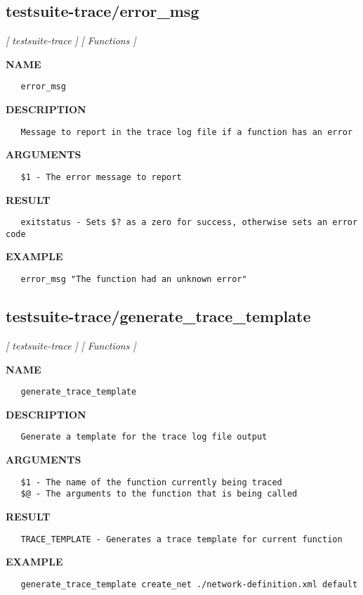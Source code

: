 \subsection{testsuite-trace/error\_msg}
\textsl{[ testsuite-trace ]}
\textsl{[ Functions ]}

\label{ch:robo52}
\label{ch:testsuite_trace_error_msg}
\textbf{NAME}
\begin{verbatim}
   error_msg
\end{verbatim}
\textbf{DESCRIPTION}
\begin{verbatim}
   Message to report in the trace log file if a function has an error
\end{verbatim}
\textbf{ARGUMENTS}
\begin{verbatim}
   $1 - The error message to report
\end{verbatim}
\textbf{RESULT}
\begin{verbatim}
   exitstatus - Sets $? as a zero for success, otherwise sets an error code
\end{verbatim}
\textbf{EXAMPLE}
\begin{verbatim}
   error_msg "The function had an unknown error"
\end{verbatim}
\newpage
\subsection{testsuite-trace/generate\_trace\_template}
\textsl{[ testsuite-trace ]}
\textsl{[ Functions ]}

\label{ch:robo53}
\label{ch:testsuite_trace_generate_trace_template}
\textbf{NAME}
\begin{verbatim}
   generate_trace_template
\end{verbatim}
\textbf{DESCRIPTION}
\begin{verbatim}
   Generate a template for the trace log file output
\end{verbatim}
\textbf{ARGUMENTS}
\begin{verbatim}
   $1 - The name of the function currently being traced
   $@ - The arguments to the function that is being called
\end{verbatim}
\textbf{RESULT}
\begin{verbatim}
   TRACE_TEMPLATE - Generates a trace template for current function
\end{verbatim}
\textbf{EXAMPLE}
\begin{verbatim}
   generate_trace_template create_net ./network-definition.xml default
\end{verbatim}
\newpage

